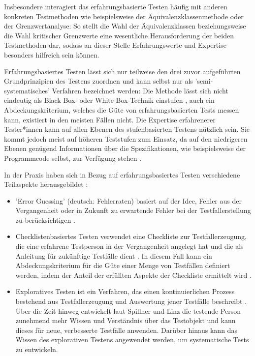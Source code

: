 Insbesondere interagiert das erfahrungsbasierte Testen häufig mit anderen konkreten Testmethoden wie beispielsweise der Äquivalenzklassenmethode oder der Grenzwertanalyse: So stellt die Wahl der Äquivalenzklassen beziehungsweise die Wahl kritischer Grenzwerte eine wesentliche Herausforderung der beiden Testmethoden dar, sodass an dieser Stelle Erfahrungswerte und Expertise besonders hilfreich sein können.

Erfahrungsbasiertes Testen lässt sich nur teilweise den drei zuvor aufgeführten Grundprinzipien des Testens zuordnen und kann selbst nur als 'semi-systematisches' Verfahren bezeichnet werden: Die Methode lässt sich nicht eindeutig als Black Box- oder White Box-Technik einstufen \cite[S. 213]{spillner2010basiswissen}, auch ein Abdeckungskriterium, welches die Güte von erfahrungsbasierten Tests messen kann, existiert in den meisten Fällen nicht. Die Expertise erfahrenerer Tester*innen kann auf allen Ebenen des stufenbasierten Testens nützlich sein. Sie kommt jedoch meist auf höheren Teststufen zum Einsatz, da auf den niedrigeren Ebenen genügend Informationen über die Spezifikationen, wie beispielsweise der Programmcode selbst, zur Verfügung stehen \cite[S. 213]{spillner2010basiswissen}.

In der Praxis haben sich in Bezug auf erfahrungsbasiertes Testen verschiedene Teilaspekte herausgebildet \cite[S.210 ff.]{spillner2010basiswissen}:
\begin{itemize}
\item 'Error Guessing' (deutsch: Fehlerraten) basiert auf der Idee, Fehler aus der Vergangenheit oder in Zukunft zu erwartende Fehler bei der Testfallerstellung zu berücksichtigen \cite[S.210 f.]{spillner2010basiswissen}.
\item Checklistenbasiertes Testen verwendet eine Checkliste zur Testfallerzeugung, die eine erfahrene Testperson in der Vergangenheit angelegt hat und die als Anleitung für zukünftige Testfälle dient \cite[S. 211 f.]{spillner2010basiswissen}. In diesem Fall kann ein Abdeckungskriterium für die Güte einer Menge von Testfällen definiert werden, indem der Anteil der erfüllten Aspekte der Checkliste ermittelt wird \cite[S. 211]{spillner2010basiswissen}.
\item Exploratives Testen ist ein Verfahren, das einen kontinuierlichen Prozess bestehend aus Testfallerzeugung und Auswertung jener Testfälle beschreibt \cite[S. 211]{spillner2010basiswissen}. Über die Zeit hinweg entwickelt laut Spillner und Linz \cite[S. 212]{spillner2010basiswissen} die testende Person zunehmend mehr Wissen und Verständnis über das Testobjekt und kann dieses für neue, verbesserte Testfälle anwenden. Darüber hinaus kann das Wissen des explorativen Testens angewendet werden, um systematische Tests zu entwickeln.
\end{itemize}

